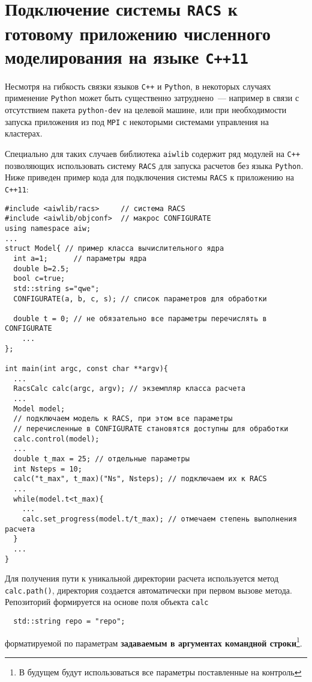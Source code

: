 \section{Подключение системы {\tt RACS} к готовому приложению численного моделирования на языке {\tt C++11}}

Несмотря на гибкость связки языков \verb'C++' и \verb'Python', в некоторых случаях применение \verb'Python'
может быть существенно затруднено~--- например в связи с отсутствием пакета \verb'python-dev' на целевой машине,
или при необходимости запуска приложения из под \verb'MPI' с некоторыми системами управления на кластерах.

Специально для таких случаев библиотека \verb'aiwlib' содержит ряд модулей на \verb'C++' позволяющих
использовать систему \verb'RACS' для запуска расчетов без языка \verb'Python'. Ниже приведен пример кода для подключения системы \verb'RACS'
к приложению на \verb'C++11':
\begin{verbatim}
#include <aiwlib/racs>     // система RACS
#include <aiwlib/objconf>  // макрос CONFIGURATE
using namespace aiw;
...
struct Model{ // пример класса вычислительного ядра
  int a=1;      // параметры ядра
  double b=2.5;
  bool c=true;
  std::string s="qwe";
  CONFIGURATE(a, b, c, s); // список параметров для обработки

  double t = 0; // не обязательно все параметры перечислять в CONFIGURATE
    ...
};

int main(int argc, const char **argv){
  ...
  RacsCalc calc(argc, argv); // экземпляр класса расчета
  ...
  Model model; 
  // подключаем модель к RACS, при этом все параметры
  // перечисленные в CONFIGURATE становятся доступны для обработки
  calc.control(model);  
  ...
  double t_max = 25; // отдельные параметры
  int Nsteps = 10;
  calc("t_max", t_max)("Ns", Nsteps); // подключаем их к RACS
  ...
  while(model.t<t_max){
    ...
    calc.set_progress(model.t/t_max); // отмечаем степень выполнения расчета
  }
  ...
}
\end{verbatim}

Для получения пути к уникальной директории расчета используется метод \verb'calc.path()',
директория создается автоматически при первом вызове метода. Репозиторий формируется на основе поля объекта \verb'calc'
\begin{verbatim}
  std::string repo = "repo";
\end{verbatim}
форматируемой по параметрам {\bf задаваемым в аргументах командной строки}\footnote{В будущем будут использоваться все параметры поставленные на контроль}.


